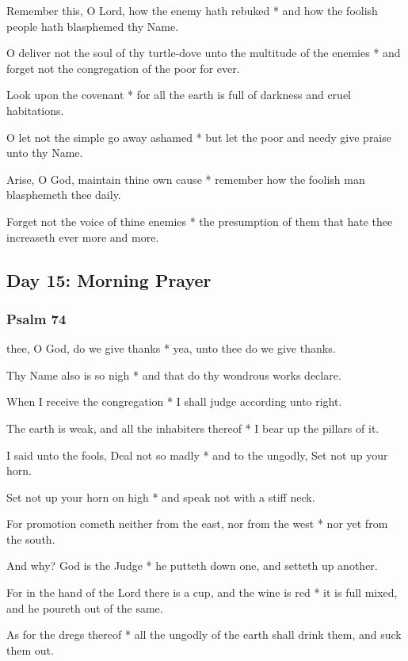 Remember this, O Lord, how the enemy hath rebuked * and how the foolish people hath blasphemed thy Name.

O deliver not the soul of thy turtle-dove unto the multitude of the enemies * and forget not the congregation of the poor for ever.

Look upon the covenant * for all the earth is full of darkness and cruel habitations.

O let not the simple go away ashamed * but let the poor and needy give praise unto thy Name.

Arise, O God, maintain thine own cause * remember how the foolish man blasphemeth thee daily.

Forget not the voice of thine enemies * the presumption of them that hate thee increaseth ever more and more.

\subsection{Day 15: Morning Prayer}

\subsubsection{Psalm 74}


 thee, O God, do we give thanks * yea, unto thee do we give thanks.

Thy Name also is so nigh * and that do thy wondrous works declare.

When I receive the congregation * I shall judge according unto right.

The earth is weak, and all the inhabiters thereof * I bear up the pillars of it.

I said unto the fools, Deal not so madly * and to the ungodly, Set not up your horn.

Set not up your horn on high * and speak not with a stiff neck.

For promotion cometh neither from the east, nor from the west * nor yet from the south.

And why? God is the Judge * he putteth down one, and setteth up another.

For in the hand of the Lord there is a cup, and the wine is red * it is full mixed, and he poureth out of the same.

As for the dregs thereof * all the ungodly of the earth shall drink them, and suck them out.


